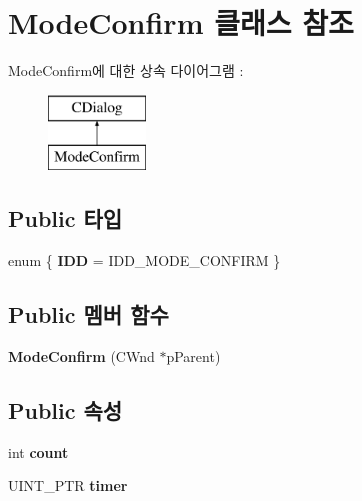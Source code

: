\hypertarget{class_mode_confirm}{}\section{Mode\+Confirm 클래스 참조}
\label{class_mode_confirm}
Mode\+Confirm에 대한 상속 다이어그램 \+: \begin{figure}[H]
\begin{center}
\leavevmode
\includegraphics[height=2.000000cm]{class_mode_confirm}
\end{center}
\end{figure}
\subsection*{Public 타입}
\begin{DoxyCompactItemize}
\item 
\mbox{\label{class_mode_confirm_a8e439d67303e9c4b5eabe35621f0b130}} 
enum \{ {\bfseries I\+DD} = I\+D\+D\+\_\+\+M\+O\+D\+E\+\_\+\+C\+O\+N\+F\+I\+RM
 \}
\end{DoxyCompactItemize}
\subsection*{Public 멤버 함수}
\begin{DoxyCompactItemize}
\item 
\mbox{\label{class_mode_confirm_ae1f0d757ed04ed5e6f5455a94bff868d}} 
{\bfseries Mode\+Confirm} (C\+Wnd $\ast$p\+Parent)
\end{DoxyCompactItemize}
\subsection*{Public 속성}
\begin{DoxyCompactItemize}
\item 
\mbox{\label{class_mode_confirm_a5084929261ffab2d070714ba905395d3}} 
int {\bfseries count}
\item 
\mbox{\label{class_mode_confirm_a14129767fe1e52b1779e533b3dc3953d}} 
U\+I\+N\+T\+\_\+\+P\+TR {\bfseries timer}
\end{DoxyCompactItemize}
